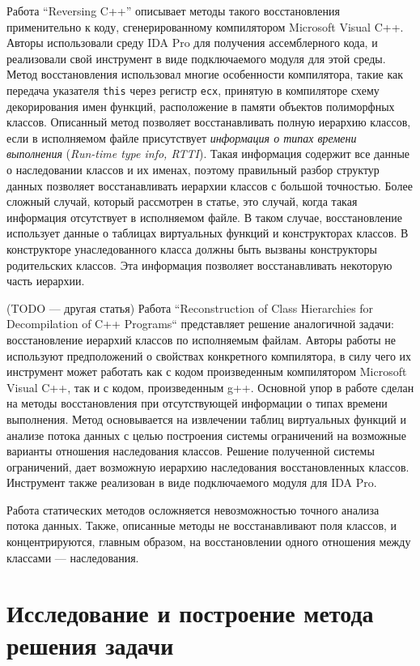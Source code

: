 \documentclass[a4paper,12pt,russian]{article}
\begin{document}
Работа ``Reversing C++'' \cite{reversing_cpp} описывает методы такого восстановления применительно к коду, сгенерированному компилятором Microsoft Visual C++.
Авторы использовали среду IDA Pro \cite{ida_pro} для получения ассемблерного кода, и реализовали свой инструмент в виде подключаемого модуля для этой среды.
Метод восстановления использовал многие особенности компилятора, такие как передача указателя \texttt{this} через регистр \texttt{ecx}, принятую в компиляторе схему декорирования имен функций, расположение в памяти объектов полиморфных классов.
Описанный метод позволяет восстанавливать полную иерархию классов, если в исполняемом файле присутствует \emph{информация о типах времени выполнения} (\emph{Run-time type info, RTTI}).
Такая информация содержит все данные о наследовании классов и их именах, поэтому правильный разбор структур данных позволяет восстанавливать иерархии классов с большой точностью.
Более сложный случай, который рассмотрен в статье, это случай, когда такая информация отсутствует в исполняемом файле.
В таком случае, восстановление использует данные о таблицах виртуальных функций и конструкторах классов.
В конструкторе унаследованного класса должны быть вызваны конструкторы родительских классов.
Эта информация позволяет восстанавливать некоторую часть иерархии.

(TODO --- другая статья)
Работа ``Reconstruction of Class Hierarchies for Decompilation of C++ Programs`` \cite{hier_recon} представляет решение аналогичной задачи: восстановление иерархий классов по исполняемым файлам.
Авторы работы не используют предположений о свойствах конкретного компилятора, в силу чего их инструмент может работать как с кодом произведенным компилятором Microsoft Visual C++, так и с кодом, произведенным g++.
Основной упор в работе сделан на методы восстановления при отсутствующей информации о типах времени выполнения.
Метод основывается на извлечении таблиц виртуальных функций и анализе потока данных с целью построения системы ограничений на возможные варианты отношения наследования классов.
Решение полученной системы ограничений, дает возможную иерархию наследования восстановленных классов.
Инструмент также реализован в виде подключаемого модуля для IDA Pro.

Работа статических методов осложняется невозможностью точного анализа потока данных.
Также, описанные методы не восстанавливают поля классов, и концентрируются, главным образом, на восстановлении одного отношения между классами --- наследования.

\newpage
\section{Исследование и построение метода решения задачи}
\end{document}
